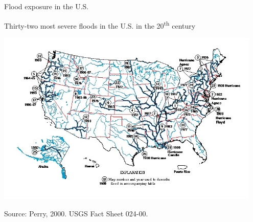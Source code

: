\documentclass[ignorenonframetext,]{beamer}
\begin{document}
\begin{frame}{Flood exposure in the U.S.}

\vspace{-0.2cm} \small

\begin{center}
Thirty-two most severe floods in the U.S. in the 20\textsuperscript{th} century
\end{center}

\vspace{-0.4cm}

\begin{center}\includegraphics[width=0.95\textwidth]{usa_flood_map} \end{center}

\vspace{-0.8cm} \scriptsize Source: Perry, 2000. USGS Fact Sheet 024-00.

\end{frame}
\end{document}
